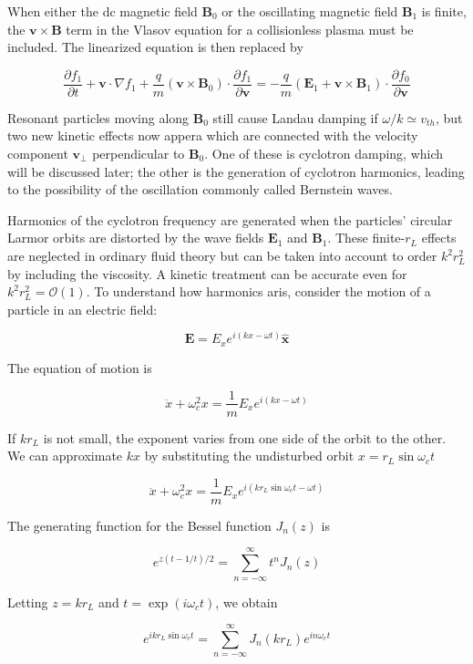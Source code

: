 \documentclass[
  notoc %
]{tufte-book}
\begin{document}
When either the dc magnetic field \(\mathbf{B}_0\) or the oscillating
magnetic field \(\mathbf{B}_1\) is finite, the
\(\mathbf{v}\times\mathbf{B}\) term in the Vlasov equation for a
collisionless plasma must be included. The linearized equation is then
replaced by

\[
\frac{\partial f_1}{\partial t} + \mathbf{v}\cdot\nabla f_1 +\frac{q}{m}(\mathbf{v}\times\mathbf{B}_0)\cdot\frac{\partial f_1}{\partial \mathbf{v}} = -\frac{q}{m}(\mathbf{E}_1 + \mathbf{v}\times\mathbf{B}_1)\cdot\frac{\partial f_0}{\partial \mathbf{v}}
\]

Resonant particles moving along \(\mathbf{B}_0\) still cause Landau
damping if \(\omega/k\simeq v_{th}\), but two new kinetic effects now
appera which are connected with the velocity component
\(\mathbf{v}_\perp\) perpendicular to \(\mathbf{B}_0\). One of these is
cyclotron damping, which will be discussed later; the other is the
generation of cyclotron harmonics, leading to the possibility of the
oscillation commonly called Bernstein waves.

Harmonics of the cyclotron frequency are generated when the particles'
circular Larmor orbits are distorted by the wave fields \(\mathbf{E}_1\)
and \(\mathbf{B}_1\). These finite-\(r_L\) effects are neglected in
ordinary fluid theory but can be taken into account to order
\(k^2r_L^2\) by including the viscosity. A kinetic treatment can be
accurate even for \(k^2r_L^2 = \mathcal{O}(1)\). To understand how
harmonics aris, consider the motion of a particle in an electric field:

\[
\mathbf{E} = E_x e^{i(kx-\omega t)}\hat{\mathbf{x}}
\]

The equation of motion is

\[
\ddot{x} + \omega_c^2 x = \frac{1}{m}E_x e^{i(kx-\omega t)}
\]

If \(kr_L\) is not small, the exponent varies from one side of the orbit
to the other. We can approximate \(kx\) by substituting the undisturbed
orbit \(x=r_L\sin\omega_c t\)

\[
\ddot{x} + \omega_c^2 x = \frac{1}{m}E_x e^{i(kr_L\sin\omega_c t-\omega t)}
\]

The generating function for the Bessel function \(J_n(z)\) is

\[
e^{z(t-1/t)/2} = \sum_{n=-\infty}^{\infty} t^n J_n(z)
\]

Letting \(z=kr_L\) and \(t = \exp(i\omega_c t)\), we obtain

\[
e^{ikr_L\sin\omega_c t} = \sum_{n=-\infty}^{\infty} J_n(kr_L) e^{in\omega_c t}
\]
\end{document}
